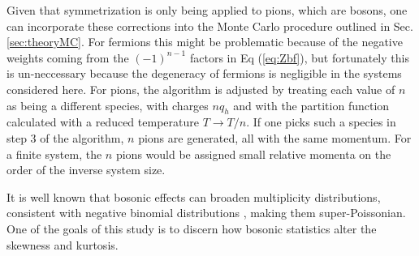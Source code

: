 Given that symmetrization is only being applied to pions, which are bosons, one can incorporate these corrections into the Monte Carlo procedure outlined in Sec. \ref{sec:theoryMC}. For fermions this might be problematic because of the negative weights coming from the $(-1)^{n-1}$ factors in Eq (\ref{eq:Zbf}), but fortunately this is un-neccessary because the degeneracy of fermions is negligible in the systems considered here. For pions, the algorithm is adjusted by treating each value of $n$ as being a different species, with charges $nq_h$ and with the partition function calculated with a reduced temperature $T\rightarrow T/n$. If one picks such a species in step 3 of the algorithm, $n$ pions are generated, all with the same momentum. For a finite system, the $n$ pions would be assigned small relative momenta on the order of the inverse system size.

It is well known that bosonic effects can broaden multiplicity distributions, consistent with negative binomial distributions \cite{Carruthers:1983my,Carruthers:1989jj}, making them super-Poissonian. One of the goals of this study is to discern how bosonic statistics alter the skewness and kurtosis. 
